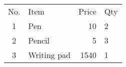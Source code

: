 \documentclass{article}
\begin{document}
	\begin{tabular}{clrl}
		No. & Item & Price & Qty \\
		1 & Pen & 10 & 2 \\
		2 & Pencil & 5 & 3 \\
		3 & Writing pad & 1540 & 1 \\
	\end{tabular}
\end{document}
